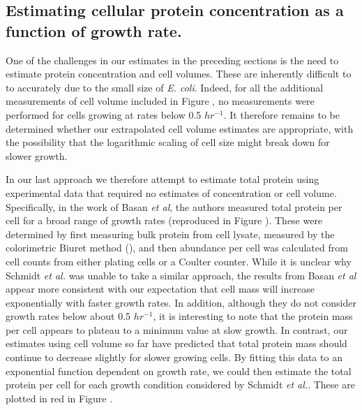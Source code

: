 \subsection{Estimating cellular protein concentration as a function of growth rate.}

One of the challenges in our estimates in the preceding  sections is the need to
estimate protein concentration and cell volumes. These are inherently difficult
to to accurately due to the small size of \textit{E. coli}. Indeed, for all the
additional measurements of cell volume included in Figure
, no measurements were performed for cells growing
at rates below 0.5 $hr^{-1}$. It therefore remains to be determined whether our
extrapolated cell volume estimates are appropriate, with the possibility that
the logarithmic scaling of cell size might break down for slower growth.

In our last approach we therefore attempt to estimate total protein using
experimental data that required  no estimates of concentration or cell volume.
Specifically, in the work of  Basan \textit{et al}, the authors measured total
protein per cell for a broad range of growth rates (reproduced in Figure
). These were determined by first measuring
bulk protein from cell lysate, measured by the colorimetric Biuret method
(\cite{You2013}), and then abundance per cell was calculated from cell counts
from either plating cells or a Coulter counter. While it is unclear why Schmidt
\textit{et al.} was unable to take a similar approach, the results from Basan
\textit{et al} appear more consistent with our expectation that cell mass will
increase exponentially with faster growth rates. In addition, although they do
not consider growth rates below about 0.5 $hr^{-1}$, it is interesting to note
that the protein mass per cell appears to plateau to a minimum value at slow
growth. In contrast, our estimates using cell volume so far have predicted that
total protein mass should continue to decrease slightly for slower growing
cells. By fitting this data to an exponential function dependent on growth rate,
we could then estimate the total protein per cell for each growth condition
considered by Schmidt \textit{et al.}. These are plotted in red in Figure
.


